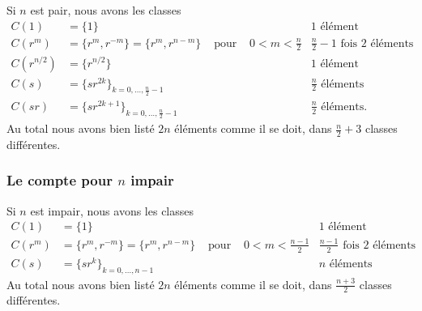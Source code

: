 Si \( n\) est pair, nous avons les classes
\begin{subequations}
	\begin{align}
		C(1)       & =\{ 1 \}                                       &               &                   & 1\text{ élément}                               \\
		C(r^m)     & =\{ r^m,r^{-m} \}=\{ r^m,r^{n-m} \}            & \text{ pour } & 0<m<\frac{ n }{2} & \frac{ n }{2}-1\text{ fois } 2\text{ éléments} \\
		C(r^{n/2}) & =\{ r^{n/2} \}                                 &               &                   & 1\text{ élément}                               \\
		C(s)       & =\{ sr^{2k} \}_{k=0,\ldots, \frac{ n }{2}-1}   &               &                   & \frac{ n }{2}\text{ éléments}                  \\
		C(sr)      & =\{ sr^{2k+1} \}_{k=0,\ldots, \frac{ n }{2}-1} &               &                   & \frac{ n }{2}\text{ éléments}.
	\end{align}
\end{subequations}
Au total nous avons bien listé \( 2n\) éléments comme il se doit, dans \(  \frac{ n }{2}+3\) classes différentes.

\subsubsection{Le compte pour \(  n\) impair}
\label{GJIzDEP}

Si \( n\) est impair, nous avons les classes
\begin{subequations}
	\begin{align}
		C(1)   & =\{ 1 \}                            &               &                     & 1\text{ élément}                               \\
		C(r^m) & =\{ r^m,r^{-m} \}=\{ r^m,r^{n-m} \} & \text{ pour } & 0<m<\frac{ n-1 }{2} & \frac{ n-1 }{2}\text{ fois } 2\text{ éléments} \\
		C(s)   & =\{ sr^k \}_{k=0,\ldots, n-1}       &               &                     & n\text{ éléments}
	\end{align}
\end{subequations}
Au total nous avons bien listé \( 2n\) éléments comme il se doit, dans \(  \frac{ n+3 }{2}\) classes différentes.

